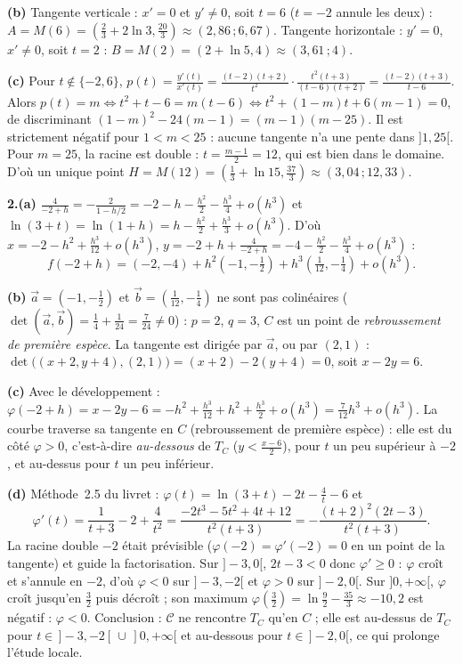 \documentclass[a4paper,11pt]{article}
\numberwithin{equation}{section}
\numberwithin{figure}{section}
\numberwithin{table}{section}
\theoremstyle{enonce}
\theoremstyle{exemple}
\theoremstyle{remarque}
\newcommand{\ve}[1]{\vec{#1}}
\begin{document}
\textbf{(b)} Tangente verticale : $x'=0$ et $y'\neq0$, soit $t=6$ ($t=-2$ annule les deux) :
$A=M(6)=\left(\frac23+2\ln3,\frac{20}3\right)\approx(2{,}86\,;6{,}67)$. Tangente horizontale : $y'=0$, $x'\neq0$, soit $t=2$ :
$B=M(2)=(2+\ln5,4)\approx(3{,}61\,;4)$.

\textbf{(c)} Pour $t\notin\{-2,6\}$, $p(t)=\frac{y'(t)}{x'(t)}=\frac{(t-2)(t+2)}{t^2}\cdot\frac{t^2(t+3)}{(t-6)(t+2)}=\frac{(t-2)(t+3)}{t-6}$.
Alors $p(t)=m\iff t^2+t-6=m(t-6)\iff t^2+(1-m)t+6(m-1)=0$, de discriminant
$(1-m)^2-24(m-1)=(m-1)(m-25)$. Il est strictement négatif pour $1<m<25$ : aucune tangente n'a une pente dans $]1,25[$. Pour
$m=25$, la racine est double : $t=\frac{m-1}2=12$, qui est bien dans le domaine. D'où un unique point
$H=M(12)=\left(\frac13+\ln15,\frac{37}3\right)\approx(3{,}04\,;12{,}33)$.

\textbf{2.(a)} $\frac4{-2+h}=-\frac2{1-h/2}=-2-h-\frac{h^2}2-\frac{h^3}4+o(h^3)$ et $\ln(3+t)=\ln(1+h)=h-\frac{h^2}2+\frac{h^3}3+o(h^3)$.
D'où $x=-2-h^2+\frac{h^3}{12}+o(h^3)$, $y=-2+h+\frac4{-2+h}=-4-\frac{h^2}2-\frac{h^3}4+o(h^3)$ :
\[f(-2+h)=(-2,-4)+h^2\left(-1,-\tfrac12\right)+h^3\left(\tfrac1{12},-\tfrac14\right)+o(h^3).\]

\textbf{(b)} $\ve a=\left(-1,-\frac12\right)$ et $\ve b=\left(\frac1{12},-\frac14\right)$ ne sont pas colinéaires
($\det(\ve a,\ve b)=\frac14+\frac1{24}=\frac7{24}\neq0$) : $p=2$, $q=3$, $C$ est un point de \emph{rebroussement de première
espèce}. La tangente est dirigée par $\ve a$, ou par $(2,1)$ : $\det\big((x+2,y+4),(2,1)\big)=(x+2)-2(y+4)=0$, soit $x-2y=6$.

\textbf{(c)} Avec le développement : $\varphi(-2+h)=x-2y-6=-h^2+\frac{h^3}{12}+h^2+\frac{h^3}2+o(h^3)=\frac7{12}h^3+o(h^3)$.
La courbe traverse sa tangente en $C$ (rebroussement de première espèce) : elle est du côté $\varphi>0$, c'est-à-dire
\emph{au-dessous} de $T_C$ ($y<\frac{x-6}2$), pour $t$ un peu supérieur à $-2$, et au-dessus pour $t$ un peu inférieur.

\textbf{(d)} Méthode~2.5 du livret : $\varphi(t)=\ln(3+t)-2t-\frac4t-6$ et
\[\varphi'(t)=\frac1{t+3}-2+\frac4{t^2}=\frac{-2t^3-5t^2+4t+12}{t^2(t+3)}=-\frac{(t+2)^2(2t-3)}{t^2(t+3)}.\]
La racine double $-2$ était prévisible ($\varphi(-2)=\varphi'(-2)=0$ en un point de la tangente) et guide la factorisation.
Sur $]-3,0[$, $2t-3<0$ donc $\varphi'\geq0$ : $\varphi$ croît et s'annule en $-2$, d'où $\varphi<0$ sur $]-3,-2[$ et $\varphi>0$ sur
$]-2,0[$. Sur $]0,+\infty[$, $\varphi$ croît jusqu'en $\frac32$ puis décroît ; son maximum
$\varphi\left(\frac32\right)=\ln\frac92-\frac{35}3\approx-10{,}2$ est négatif : $\varphi<0$. Conclusion : $\mathcal C$ ne rencontre
$T_C$ qu'en $C$ ; elle est au-dessus de $T_C$ pour $t\in\,]-3,-2[\,\cup\,]0,+\infty[$ et au-dessous pour $t\in\,]-2,0[$, ce
qui prolonge l'étude locale.
\end{document}
